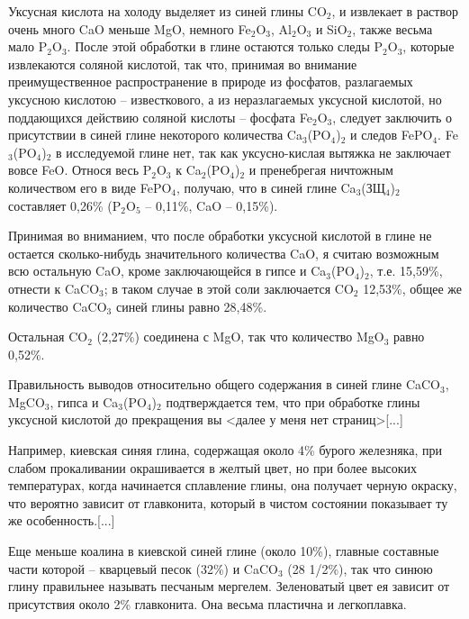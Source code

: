 Уксусная кислота на холоду выделяет из синей глины CO$_2$, и извлекает в раствор очень много CaO меньше MgO, немного Fe$_2$O$_3$, Al$_2$O$_3$ и SiO$_2$, также весьма мало P$_2$O$_3$. После этой обработки в глине остаются только следы P$_2$O$_3$, которые извлекаются соляной кислотой, так что, принимая во внимание преимущественное распространение в природе из фосфатов, разлагаемых уксусною кислотою – известкового, а из неразлагаемых уксусной кислотой, но поддающихся действию соляной кислоты – фосфата Fe$_2$O$_3$, следует заключить о присутствии в синей глине некоторого количества Ca$_3$(PO$_4$)$_2$ и следов FePO$_4$. Fe$_3$(PO$_4$)$_2$ в исследуемой глине нет, так как уксусно-кислая вытяжка не заключает вовсе FeO. Относя весь P$_2$O$_3$ к Ca$_2$(PO$_4$)$_2$ и пренебрегая ничтожным количеством его в виде FePO$_4$, получаю, что в синей глине Ca$_3$(ЗЩ$_4$)$_2$ составляет 0,26\% (P$_2$O$_5$ – 0,11\%, CaO – 0,15\%).

Принимая во вниманием, что после обработки уксусной кислотой в глине не остается сколько-нибудь значительного количества CaO, я считаю возможным всю остальную CaO, кроме заключающейся в гипсе и Ca$_3$(PO$_4$)$_2$, т.е. 15,59\%, отнести к CaCO$_3$; в таком случае в этой соли заключается CO$_2$ 12,53\%, общее же количество CaCO$_3$ синей глины равно 28,48\%.

Остальная CO$_2$ (2,27\%) соединена с MgO, так что количество MgO$_3$ равно 0,52\%.

Правильность выводов относительно общего содержания в синей глине CaCO$_3$, MgCO$_3$, гипса и Ca$_3$(PO$_4$)$_2$ подтверждается тем, что при обработке глины уксусной кислотой до прекращения вы <далее у меня нет страниц>[...]

Например, киевская синяя глина, содержащая около 4\% бурого железняка, при слабом прокаливании окрашивается в желтый цвет, но при более высоких температурах, когда начинается сплавление глины, она получает черную окраску, что вероятно зависит от главконита, который в чистом состоянии показывает ту же особенность.[...]

Еще меньше коалина в киевской синей глине (около 10\%), главные составные части которой – кварцевый песок (32\%) и CaCO$_3$ (28 1/2\%), так что синюю глину правильнее называть песчаным мергелем. Зеленоватый цвет ея зависит от присутствия около 2\% главконита. Она весьма пластична и легкоплавка.
